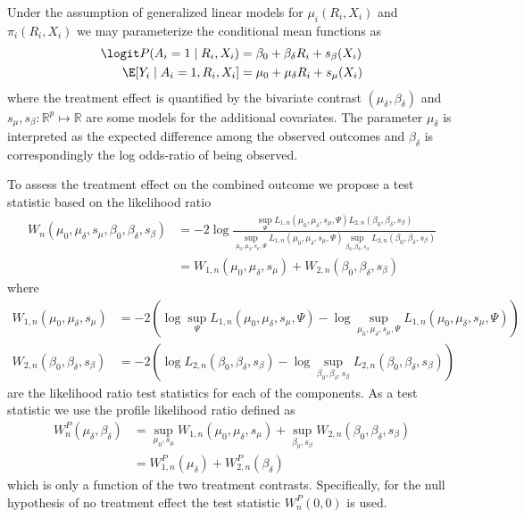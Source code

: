 Under the assumption of generalized linear models for $\mu_i(R_i, X_i)$ and $\pi_i(R_i, X_i)$ we may parameterize the conditional mean functions as
\begin{align}
  \logit P(A_i = 1 \mid R_i, X_i) &= \beta_0 + \beta_{\delta} R_i + s_\beta(X_i)\label{eq:glm1}\\
  \E[Y_i \mid A_i = 1, R_i, X_i] &= \mu_0 + \mu_{\delta} R_i + s_\mu(X_i)\label{eq:glm2}
\end{align}
where the treatment effect is quantified by the bivariate contrast $(\mu_\delta, \beta_\delta)$ and $s_\mu, s_\beta \colon \mathbb{R}^p \mapsto \mathbb{R}$ are some models for the additional covariates. The parameter $\mu_\delta$ is interpreted as the expected difference among the observed outcomes and $\beta_\delta$ is correspondingly the log odds-ratio of being observed.

To assess the treatment effect on the combined outcome we propose a test statistic based on the likelihood ratio
\begin{equation*}
\begin{aligned}
  W_n(\mu_0, \mu_\delta, s_\mu, \beta_0, \beta_\delta, s_\beta) &= -2 \log \frac{\sup\limits_{\Psi} L_{1,n}(\mu_0, \mu_\delta, s_\mu, \Psi) L_{2,n}(\beta_0, \beta_\delta, s_\beta)}{\sup\limits_{\mu_0, \mu_\delta, s_\mu, \Psi} L_{1,n}(\mu_0, \mu_\delta, s_\mu, \Psi) \sup\limits_{\beta_0, \beta_\delta, s_\beta} L_{2,n}(\beta_0, \beta_\delta, s_\beta)}\label{eq:lrtgeneral}\\
  &= W_{1,n}(\mu_0, \mu_\delta, s_\mu) + W_{2,n}(\beta_0, \beta_\delta, s_\beta)
\end{aligned}
\end{equation*}
where
\begin{align*}
  W_{1,n}(\mu_0, \mu_\delta, s_\mu) &= -2\left(\log \sup\limits_{\Psi} L_{1,n}(\mu_0, \mu_\delta, s_\mu, \Psi) - \log \sup\limits_{\mu_0, \mu_\delta, s_\mu, \Psi} L_{1,n}(\mu_0, \mu_\delta, s_\mu, \Psi)\right)\\
  W_{2,n}(\beta_0, \beta_\delta, s_\beta) &= -2\left(\log L_{2,n}(\beta_0, \beta_\delta, s_\beta) - \log \sup\limits_{\beta_0, \beta_\delta, s_\beta} L_{2,n}(\beta_0, \beta_\delta, s_\beta)\right)
\end{align*}
are the likelihood ratio test statistics for each of the components. As a test statistic we use the profile likelihood ratio defined as
\begin{equation}
\begin{aligned}
  W_n^P(\mu_\delta, \beta_\delta) &= \sup\limits_{\mu_0, s_\mu} W_{1,n}(\mu_0, \mu_\delta, s_\mu) + \sup\limits_{\beta_0, s_\beta} W_{2,n}(\beta_0, \beta_\delta, s_\beta)\label{eq:LRTtotal}\\
  &= W_{1,n}^P(\mu_\delta) + W_{2,n}^P(\beta_\delta)
\end{aligned}
\end{equation}
which is only a function of the two treatment contrasts. Specifically, for the null hypothesis of no treatment effect the test statistic $W_n^P(0, 0)$ is used.

